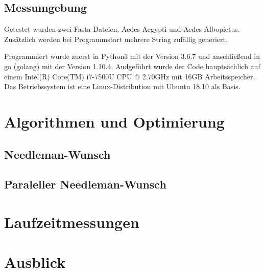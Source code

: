 \documentclass[a4paper]{article}
\begin{document}

\subsection{Messumgebung}
Getestet wurden zwei Fasta-Dateien, Aedes Aegypti und Aedes Albopictus. Zusätzlich werden bei Programmstart mehrere String zufällig generiert. 

Programmiert wurde zuerst in Python3 mit der Version 3.6.7 und anschließend in go (golang) mit der Version 1.10.4. Audgeführt wurde der Code hauptsächlich auf einem Intel(R) Core(TM) i7-7500U CPU @ 2.70GHz mit 16GB Arbeitsspeicher. Das Betriebssystem ist eine Linux-Distribution mit Ubuntu 18.10 als Basis.



\section{Algorithmen und Optimierung}
\subsection{Needleman-Wunsch}
\subsection{Paraleller Needleman-Wunsch}

\section{Laufzeitmessungen}



\section{Ausblick}
\end{document}
